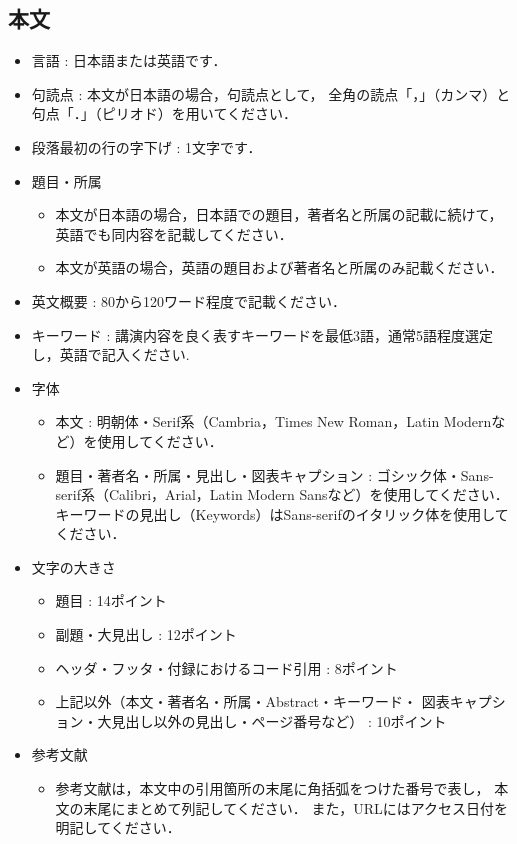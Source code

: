 \documentclass{../../style/ltjoc}
\begin{document}
\subsection{本文}
\begin{itemize}
\item 言語 : 日本語または英語です．
\item 句読点 : 本文が日本語の場合，句読点として，
  全角の読点「，」（カンマ）と句点「．」（ピリオド）を用いてください． 
\item 段落最初の行の字下げ : 1文字です．
\item 題目・所属
  \begin{itemize}
  \item 
    本文が日本語の場合，日本語での題目，著者名と所属の記載に続けて，
    英語でも同内容を記載してください．
  \item 
    本文が英語の場合，英語の題目および著者名と所属のみ記載ください．
  \end{itemize}
\item 英文概要 : 80から120ワード程度で記載ください．
\item キーワード : 講演内容を良く表すキーワードを最低3語，通常5語程度選定し，英語で記入ください.
\item 字体
  \begin{itemize}
  \item 本文 :
    明朝体・Serif系（Cambria，Times New Roman，Latin Modernなど）を使用してください．
  \item 題目・著者名・所属・見出し・図表キャプション : 
    ゴシック体・Sans-serif系（Calibri，Arial，Latin Modern Sansなど）を使用してください．
    キーワードの見出し（Keywords）はSans-serifのイタリック体を使用してください．
  \end{itemize}
\item 文字の大きさ
  \begin{itemize}
  \item 題目 : 14ポイント
  \item 副題・大見出し : 12ポイント
  \item ヘッダ・フッタ・付録におけるコード引用 : 8ポイント
  \item 上記以外（本文・著者名・所属・Abstract・キーワード・
      図表キャプション・大見出し以外の見出し・ページ番号など） : 10ポイント
  \end{itemize}
\item 参考文献
  \begin{itemize}
  \item 
  参考文献は，本文中の引用箇所の末尾に角括弧をつけた番号で表し，
  本文の末尾にまとめて列記してください\cite{Nishi:OpenCAE2018-001,BB21459576}．
  また，URLにはアクセス日付を明記してください\cite{SIST02-200}．
  \end{itemize}
\end{itemize}
\end{document}
